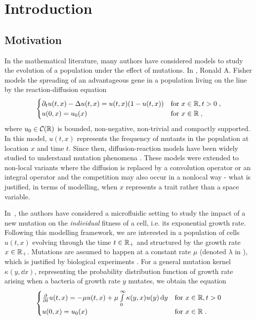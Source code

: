 \section{Introduction}
\subsection{Motivation} \mbox{}

In the mathematical literature, many authors have considered models to study the evolution of a population under the effect of mutations. In \cite{fisher1937wave}, Ronald A. Fisher models the spreading of an advantageous gene in a population living on the line by the reaction-diffusion equation
    \begin{equation*}
        \begin{cases}
            \partial_t u(t,x) - \Delta u(t,x) = u(t,x)(1-u(t,x)) & \text{for } x \in \mathbb{R},  t > 0
            \; ,
            \\
            u(0, x) = u_0(x)     & \text{for } x \in \mathbb{R} \; ,
        \end{cases}
    \end{equation*} 
where $u_0 \in \mathcal{C}(\mathbb{R})$ is bounded, non-negative, non-trivial and compactly supported. 
In this model, $u(t,x)$ represents the frequency of mutants in the population at location $x$ and time $t$.
Since then, diffusion-reaction models have been widely studied to understand mutation phenomena \cite{fife1979mathematical, lam2022introduction}. 
These models were extended to non-local variants where the diffusion is replaced by a convolution operator \cite{coville2007non, alfaro2023confining} or an integral operator \cite{burger1996stationary, bonnefon2017concentration} {\MD and the competition may also occur in a nonlocal way - what is justified, in terms of modelling, when $x$  represents a trait rather than a space variable}.

In~\cite{robert2018mutation}, the authors have considered a microfluidic setting to study the impact of a new mutation on the {\MD \it individual} fitness of a cell, {\MD i.e. its exponential growth rate}. 
{\MD Following this modelling framework}, we are interested in a population of cells $u(t,x)$ evolving through the time $t \in \mathbb{R}_+$ and structured by the growth rate $x \in \mathbb{R}_+$. Mutations are assumed to happen at a constant rate $\mu$ (denoted $\lambda$ in \cite{robert2018mutation}), which is justified by biological experiments \cite{robert2018mutation}.  {\MD For a general mutation kernel $\kappa(y,\dd x)$, representing the probability distribution function of growth rate arising when a bacteria of growth rate $y$ mutates, we obtain the equation}
    \begin{equation}
    \begin{cases}
    \frac{\partial}{\partial t} u(t,x) = - \mu u(t,x) + \mu \int\limits_0^\infty \kappa(y,x) u(y) \,\mathrm{d} y 
    & \text{for } x \in \mathbb{R},  t > 0
    \\
    u(0,x) = u_0(x)  & \text{for } x \in \mathbb{R} \; .
    \end{cases}
    \label{eq:lydia}
    \end{equation}

